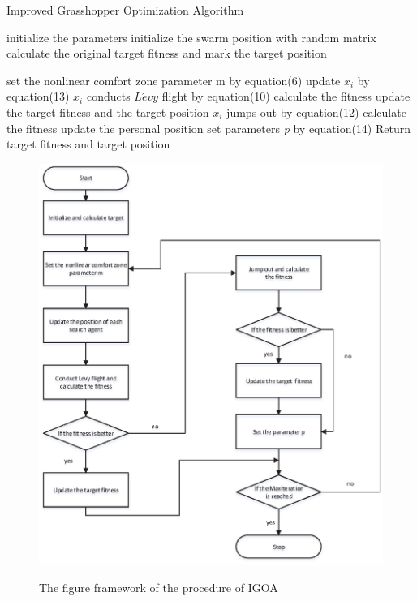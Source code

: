 \begin{algorithm}
    \caption{Improved Grasshopper Optimization Algorithm}
    \label{alg:IGOA}
    
    \begin{algorithmic}[1]
    
    \State initialize the parameters
    \State initialize the swarm position with random matrix 
    \State calculate the original target fitness and mark the target position
    
    \State set the nonlinear comfort zone parameter m by equation(6)
    \State update $x_i$ by equation(13)
    \State $x_i$ conducts $L\acute{e}vy$ flight by equation(10)
    \State calculate the fitness 
        \State update the target fitness and the target position
    \Else
        \State$x_i$ jumps out by equation(12)
        \State calculate the fitness
            \State update the personal position
        \EndIf
        \State set parameters \emph{p} by equation(14)
    \EndIf
    \EndWhile
    \State Return target fitness and target position
    \end{algorithmic}
\end{algorithm}

\graphicspath{{Img/}}
\begin{figure}[htbp]
    \centering
    \includegraphics[width=1\linewidth]{procedure_of_IGOA.eps}\hfill\\[0.5cm]
  \caption{The figure framework of the procedure of IGOA}
  \label{fig:procedure_IGOA}
  \end{figure}
